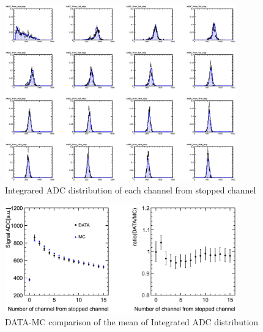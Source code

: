 \begin{figure}[htbp]
  \centering
  \includegraphics[width=10cm,clip]{fig/stop_proton2.eps}
  \caption{Integrared ADC distribution of each channel from stopped channel}
  \label{fig:ADC_distribution}
\end{figure}

\begin{figure}[htbp]
  \centering
  \includegraphics[width=10cm,clip]{fig/stop_proton3.eps}
  \caption{DATA-MC comparison of the mean of Integrated ADC distribution}
  \label{fig:Mean_comparison}
\end{figure}
